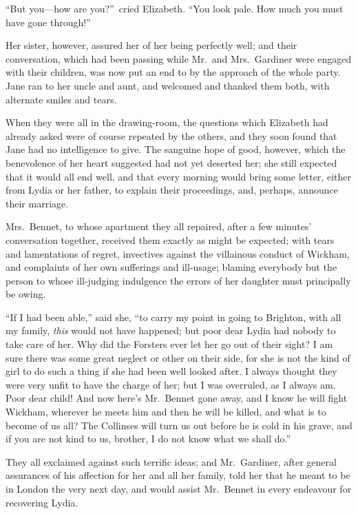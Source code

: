 \documentclass[12pt,english]{book}
\begin{document}
{}``But you\mbox{---}how are you?''\ cried Elizabeth. {}``You
look pale. How much you must have gone through!''\ 

Her sister, however, assured her of her being perfectly well; and
their conversation, which had been passing while Mr.\ and Mrs.\ Gardiner
were engaged with their children, was now put an end to by the approach
of the whole party. Jane ran to her uncle and aunt, and welcomed and
thanked them both, with alternate smiles and tears.

When they were all in the drawing-room, the questions which Elizabeth
had already asked were of course repeated by the others, and they
soon found that Jane had no intelligence to give. The sanguine hope
of good, however, which the benevolence of her heart suggested had
not yet deserted her; she still expected that it would all end well,
and that every morning would bring some letter, either from Lydia
or her father, to explain their proceedings, and, perhaps, announce
their marriage.

Mrs.\ Bennet, to whose apartment they all repaired, after a few minutes'
conversation together, received them exactly as might be expected;
with tears and lamentations of regret, invectives against the villainous
conduct of Wickham, and complaints of her own sufferings and ill-usage;
blaming everybody but the person to whose ill-judging indulgence the
errors of her daughter must principally be owing.

{}``If I had been able,'' said she, {}``to carry my point in going
to Brighton, with all my family, \textit{this} would not have happened;
but poor dear Lydia had nobody to take care of her. Why did the Forsters
ever let her go out of their sight? I am sure there was some great
neglect or other on their side, for she is not the kind of girl to
do such a thing if she had been well looked after. I always thought
they were very unfit to have the charge of her; but I was overruled,
as I always am. Poor dear child! And now here's Mr.\ Bennet gone
away, and I know he will fight Wickham, wherever he meets him and
then he will be killed, and what is to become of us all? The Collinses
will turn us out before he is cold in his grave, and if you are not
kind to us, brother, I do not know what we shall do.''

They all exclaimed against such terrific ideas; and Mr.\ Gardiner,
after general assurances of his affection for her and all her family,
told her that he meant to be in London the very next day, and would
assist Mr.\ Bennet in every endeavour for recovering Lydia.
\end{document}
